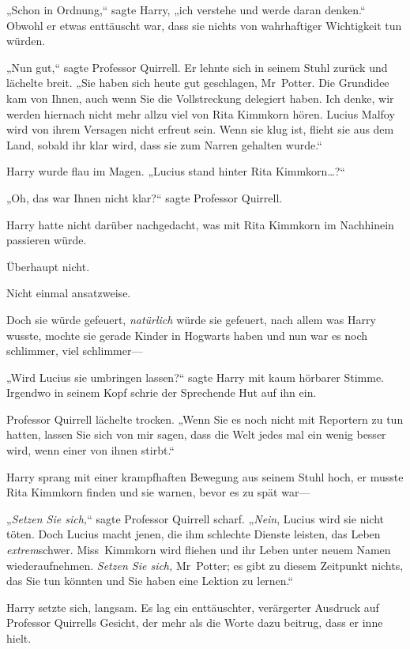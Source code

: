 {„Schon in Ordnung,“ sagte Harry, „ich verstehe und werde daran denken.“ Obwohl er etwas enttäuscht war, dass sie nichts von wahrhaftiger Wichtigkeit tun würden.

„Nun gut,“ sagte Professor Quirrell. Er lehnte sich in seinem Stuhl zurück und lächelte breit. „Sie haben sich heute gut geschlagen, Mr~Potter. Die Grundidee kam von Ihnen, auch wenn Sie die Vollstreckung delegiert haben. Ich denke, wir werden hiernach nicht mehr allzu viel von Rita Kimmkorn hören. Lucius Malfoy wird von ihrem Versagen nicht erfreut sein. Wenn sie klug ist, flieht sie aus dem Land, sobald ihr klar wird, dass sie zum Narren gehalten wurde.“

Harry wurde flau im Magen. „Lucius stand hinter Rita Kimmkorn…?“

„Oh, das war Ihnen nicht klar?“ sagte Professor Quirrell.

Harry hatte nicht darüber nachgedacht, was mit Rita Kimmkorn im Nachhinein passieren würde.

Überhaupt nicht.

Nicht einmal ansatzweise.

Doch sie würde gefeuert, \emph{natürlich} würde sie gefeuert, nach allem was Harry wusste, mochte sie gerade Kinder in Hogwarts haben und nun war es noch schlimmer, viel schlimmer—

„Wird Lucius sie umbringen lassen?“ sagte Harry mit kaum hörbarer Stimme. Irgendwo in seinem Kopf schrie der Sprechende Hut auf ihn ein.

Professor Quirrell lächelte trocken. „Wenn Sie es noch nicht mit Reportern zu tun hatten, lassen Sie sich von mir sagen, dass die Welt jedes mal ein wenig besser wird, wenn einer von ihnen stirbt.“

Harry sprang mit einer krampfhaften Bewegung aus seinem Stuhl hoch, er musste Rita Kimmkorn finden und sie warnen, bevor es zu spät war—

„\emph{Setzen Sie sich,}“ sagte Professor Quirrell scharf. „\emph{Nein}, Lucius wird sie nicht töten. Doch Lucius macht jenen, die ihm schlechte Dienste leisten, das Leben \emph{extrem}schwer. Miss~Kimmkorn wird fliehen und ihr Leben unter neuem Namen wiederaufnehmen. \emph{Setzen Sie sich,} Mr~Potter; es gibt zu diesem Zeitpunkt nichts, das Sie tun könnten und Sie haben eine Lektion zu lernen.“

Harry setzte sich, langsam. Es lag ein enttäuschter, verärgerter Ausdruck auf Professor Quirrells Gesicht, der mehr als die Worte dazu beitrug, dass er inne hielt.

}

